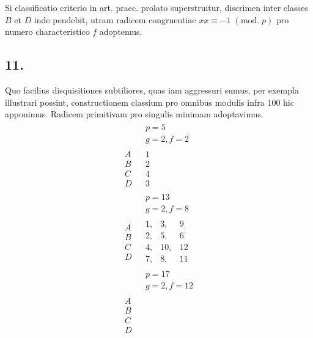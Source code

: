 \documentclass[twoside,12pt]{memoir}
\renewcommand{\pmod}[1]{\;(\textrm{mod.}\;#1)}
\begin{document}
Si classificatio criterio in art. praec. prolato superstruitur, discrimen inter classes \(B\) et \(D\) inde pendebit, utram radicem congruentiae \(x x \equiv-1\pmod{p}\) pro numero characteristico \(f\) adoptemus.

\subsection*{11.}
 
Quo facilius disquisitiones subtiliores, quas iam aggressuri sumus, per exempla illustrari possint, constructionem classium pro omnibus modulis infra 100 hic apponimus. Radicem primitivam pro singulis minimam adoptavimus.
\[\begin{aligned}
& \begin{array}{c} p=5 \\  g=2, f=2 \end{array} \\
\begin{array}{l} A \\ B \\ C \\D \end{array} & \begin{array}{|r} 1 \\ 2 \\ 4 \\ 3 \end{array} \\
& \begin{array}{c} p=13 \\  g=2, f=8 \end{array} \\ 
\begin{array}{l} A \\ B \\ C \\D \end{array} & \begin{array}{|rrr} 1,& 3,& 9 \\ 2,& 5,&6 \\ 4,& 10,& 12 \\ 7,& 8,& 11 \end{array}\\
& \begin{array}{c} p=17 \\  g=2, f=12 \end{array} \\
\begin{array}{l} A \\ B \\ C \\D \end{array} & 

\end{aligned}\]
\end{document}
